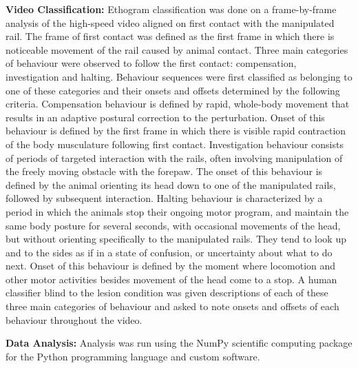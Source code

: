\textbf{Video Classification:} Ethogram classification was done on a frame-by-frame analysis of the high-speed video aligned on first contact with the manipulated rail. The frame of first contact was defined as the first frame in which there is noticeable movement of the rail caused by animal contact. Three main categories of behaviour were observed to follow the first contact: compensation, investigation and halting. Behaviour sequences were first classified as belonging to one of these categories and their onsets and offsets determined by the following criteria. Compensation behaviour is defined by rapid, whole-body movement that results in an adaptive postural correction to the perturbation. Onset of this behaviour is defined by the first frame in which there is visible rapid contraction of the body musculature following first contact. Investigation behaviour consists of periods of targeted interaction with the rails, often involving manipulation of the freely moving obstacle with the forepaw. The onset of this behaviour is defined by the animal orienting its head down to one of the manipulated rails, followed by subsequent interaction. Halting behaviour is characterized by a period in which the animals stop their ongoing motor program, and maintain the same body posture for several seconds, with occasional movements of the head, but without orienting specifically to the manipulated rails. They tend to look up and to the sides as if in a state of confusion, or uncertainty about what to do next. Onset of this behaviour is defined by the moment where locomotion and other motor activities besides movement of the head come to a stop. A human classifier blind to the lesion condition was given descriptions of each of these three main categories of behaviour and asked to note onsets and offsets of each behaviour throughout the video.

\textbf{Data Analysis:} Analysis was run using the NumPy scientific computing package for the Python programming language and custom software.